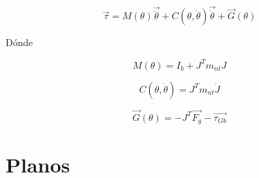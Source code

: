                  \[ \overrightarrow{ \tau}=M \left(  \theta  \right) \overrightarrow{\ddot{ \theta }}+C \left(  \theta ,\dot{ \theta } \right) \overrightarrow{\dot{ \theta }}+ \overrightarrow{G} \left(  \theta  \right)  \] 
                
                Dónde
                
                 \[ M \left(  \theta  \right) =I_{b}+J^{T} m_{nt} J \] 
                
                 \[ C \left(  \theta ,\dot{ \theta } \right) =J^{T} m_{nt}\dot{J} \] 
                
                 \[ \overrightarrow{G} \left(  \theta  \right) =- J^{T}\overrightarrow{F_{g}}-\overrightarrow{ \tau_{Gb}} \] 
         \newpage



        
\chapter{Planos}\label{anexoC}
\thispagestyle{fancy}
    \section{}
        \subsection{}